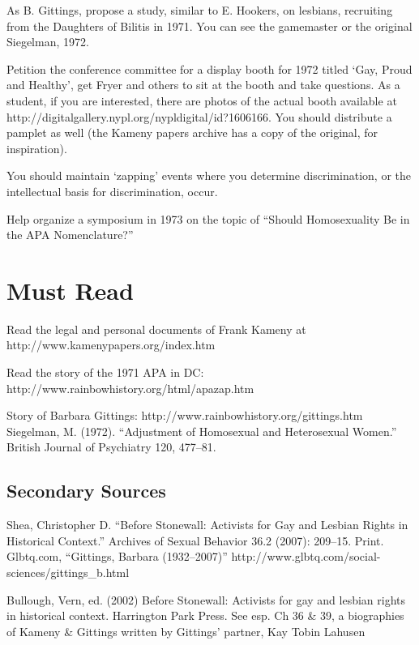 As B. Gittings, propose a study, similar to E. Hookers, on lesbians, recruiting from the Daughters of Bilitis in 1971. You can see the gamemaster or the original Siegelman, 1972.

Petition the conference committee for a display booth for 1972 titled `Gay, Proud and Healthy', get Fryer and others to sit at the booth and take questions. As a student, if you are interested, there are photos of the actual booth available at http:\slash \slash digitalgallery.nypl.org\slash nypldigital\slash id?1606166. You should distribute a pamplet as well (the Kameny papers archive has a copy of the original, for inspiration).

You should maintain `zapping' events where you determine discrimination, or the intellectual basis for discrimination, occur.

Help organize a symposium in 1973 on the topic of ``Should Homosexuality Be in the APA Nomenclature?''

\section{Must Read}
\label{mustread}

Read the legal and personal documents of Frank Kameny at http:\slash \slash www.kamenypapers.org\slash index.htm

Read the story of the 1971 APA in DC: http:\slash \slash www.rainbowhistory.org\slash html\slash apazap.htm

Story of Barbara Gittings: http:\slash \slash www.rainbowhistory.org\slash gittings.htm
Siegelman, M. (1972). ``Adjustment of Homosexual and Heterosexual Women.'' British Journal of Psychiatry 120, 477--81.

\subsection{Secondary Sources}
\label{secondarysources}

Shea, Christopher D. ``Before Stonewall: Activists for Gay and Lesbian Rights in Historical Context.'' Archives of Sexual Behavior 36.2 (2007): 209--15. Print.
Glbtq.com, ``Gittings, Barbara (1932--2007)'' http:\slash \slash www.glbtq.com\slash social-sciences\slash gittings\_b.html

Bullough, Vern, ed. (2002) Before Stonewall: Activists for gay and lesbian rights in historical context. Harrington Park Press. See esp. Ch 36 \& 39, a biographies of Kameny \& Gittings written by Gittings' partner, Kay Tobin Lahusen

